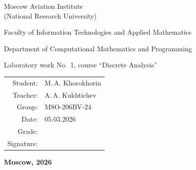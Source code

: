 \begin{titlepage}
\begin{center}
\bfseries

{\Large Moscow Aviation Institute\\ (National Research University)

}

\vspace{48pt}

{\large Faculty of Information Technologies and Applied Mathematics
}

\vspace{36pt}

{\large Department of Computational Mathematics and Programming

}

\vspace{48pt}

Laboratory work No.~1, course \enquote{Discrete Analysis}

\end{center}

\vspace{72pt}

\begin{flushright}
\begin{tabular}{rl}
Student: & M.\,A. Khorokhorin \\
Teacher: & A.\,A. Kukhtichev \\
Group: & M8O-206BV-24 \\
Date: & 05.03.2026 \\
Grade: & \\
Signature: & \\
\end{tabular}
\end{flushright}

\vfill

\begin{center}
\bfseries
Moscow, 2026
\end{center}
\end{titlepage}

\pagebreak
